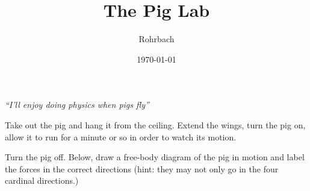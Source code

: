 \documentclass[10pt]{exam}
\title{The Pig Lab}
\author{Rohrbach}
\date{\today}
\begin{document}
\maketitle

\vspace{-.7em}

\noindent
\emph{``I'll enjoy doing physics when pigs fly''}
\vspace{1em}

\noindent
Take out the pig and hang it from the ceiling.  Extend the wings, turn the pig on, allow it to run for a minute or so in order to watch its motion.

\begin{questions}
  
\question \label{fbd}
  Turn the pig off.  Below, draw a free-body diagram of the pig in motion and label the forces in the correct directions (hint: they may not only go in the four cardinal directions.) 


  
  
  
  

  

\end{questions}
\end{document}
